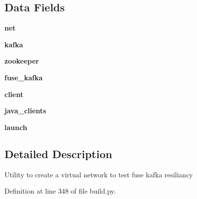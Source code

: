 \subsection*{\-Data \-Fields}
\begin{DoxyCompactItemize}
\item 
\hypertarget{classbuild_1_1TestMininet_af25a115402073806776bb044166582c5}{{\bfseries net}}\label{classbuild_1_1TestMininet_af25a115402073806776bb044166582c5}

\item 
\hypertarget{classbuild_1_1TestMininet_a19fdf32f6e4a5c549ecdfd8d10154c9e}{{\bfseries kafka}}\label{classbuild_1_1TestMininet_a19fdf32f6e4a5c549ecdfd8d10154c9e}

\item 
\hypertarget{classbuild_1_1TestMininet_aa22f4195bb2ba1e4f566fd0d0dd68644}{{\bfseries zookeeper}}\label{classbuild_1_1TestMininet_aa22f4195bb2ba1e4f566fd0d0dd68644}

\item 
\hypertarget{classbuild_1_1TestMininet_aad28b00ed30aa22a2fd5aa10acddb01f}{{\bfseries fuse\-\_\-kafka}}\label{classbuild_1_1TestMininet_aad28b00ed30aa22a2fd5aa10acddb01f}

\item 
\hypertarget{classbuild_1_1TestMininet_ae4493ea1ec4b060509916390a2e3787b}{{\bfseries client}}\label{classbuild_1_1TestMininet_ae4493ea1ec4b060509916390a2e3787b}

\item 
\hypertarget{classbuild_1_1TestMininet_a3f2a95206e01e7d4c096df1366cabab9}{{\bfseries java\-\_\-clients}}\label{classbuild_1_1TestMininet_a3f2a95206e01e7d4c096df1366cabab9}

\item 
\hypertarget{classbuild_1_1TestMininet_a0409fdeedd0876acc047a7df996676dc}{{\bfseries launch}}\label{classbuild_1_1TestMininet_a0409fdeedd0876acc047a7df996676dc}

\end{DoxyCompactItemize}


\subsection{\-Detailed \-Description}
\begin{DoxyVerb}Utility to create a virtual network to test fuse kafka resiliancy \end{DoxyVerb}
 

\-Definition at line 348 of file build.\-py.



